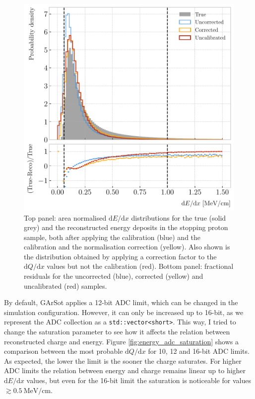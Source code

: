 \begin{figure}[t]
	\centering
	\includegraphics[width=.80\linewidth]{Images/GArSoft_PID/dEdx/reco_dEdx_corrected_1d.pdf}
	\caption[Area normalised $\mathrm{d}E/\mathrm{d}x$ distributions for the true and the reconstructed energy deposits in the stopping proton sample, both after applying the calibration and the calibration and the normalisation correction.]{Top panel: area normalised $\mathrm{d}E/\mathrm{d}x$ distributions for the true (solid grey) and the reconstructed energy deposits in the stopping proton sample, both after applying the calibration (blue) and the calibration and the normalisation correction (yellow). Also shown is the distribution obtained by applying a correction factor to the $\mathrm{d}Q/\mathrm{d}x$ values but not the calibration (red). Bottom panel: fractional residuals for the uncorrected (blue), corrected (yellow) and uncalibrated (red) samples.}
	\label{fig:energy_correction}
\end{figure}

By default, GArSot applies a 12-bit ADC limit, which can be changed in the simulation configuration. However, it can only be increased up to 16-bit, as we represent the ADC collection as a \texttt{std::vector<short>}. This way, I tried to change the saturation parameter to see how it affects the relation between reconstructed charge and energy. Figure \ref{fig:energy_adc_saturation} shows a comparison between the most probable $\mathrm{d}Q/\mathrm{d}x$ for 10, 12 and 16-bit ADC limits. As expected, the lower the limit is the sooner the charge saturates. For higher ADC limits the relation between energy and charge remains linear up to higher $\mathrm{d}E/\mathrm{d}x$ values, but even for the 16-bit limit the saturation is noticeable for values $\gtrsim 0.5 ~ \mathrm{MeV}/\mathrm{cm}$.

